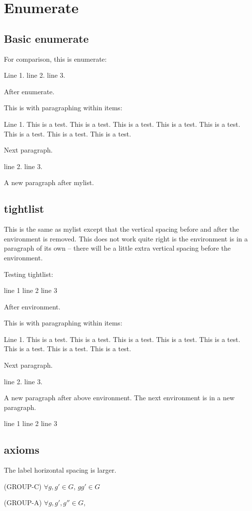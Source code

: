 \section{Enumerate}


\subsection{Basic enumerate}
For comparison, this is enumerate:
\begin{enumerate}
\li Line 1. 
\li line 2.
\li line 3.
\end{enumerate}
After enumerate.

This is with paragraphing within items:
\begin{enumerate}
\li Line 1. 
This is a test. This is a test. This is a test. This is a test. 
This is a test. This is a test. This is a test. This is a test. 

Next paragraph.
\lipsum[1]

\li line 2.
\li line 3.
\end{enumerate}

A new paragraph after mylist.




\newpage
\subsection{tightlist}

This is the same as mylist except that the vertical spacing
before and after the environment is removed.
This does not work quite right is the environment is in a paragraph of its
own -- there will be a little extra vertical spacing before the environment.

Testing tightlist:
\begin{tightlist}
\li line 1
\li line 2
\li line 3
\end{tightlist}
After environment.

This is with paragraphing within items:
\begin{tightlist}
\li Line 1. 
This is a test. This is a test. This is a test. This is a test. 
This is a test. This is a test. This is a test. This is a test. 

Next paragraph.
\lipsum[1]

\li line 2.
\li line 3.
\end{tightlist}

A new paragraph after above environment.
The next environment is in a new paragraph.

\begin{tightlist}
\li line 1
\li line 2
\li line 3
\end{tightlist}


\newpage
\subsection{axioms}

The label horizontal spacing is larger.

\begin{axioms}
  \item[(GROUP-C)] $\forall g,g' \in G$, $gg' \in G$
  \item[(GROUP-A)] $\forall g,g',g'' \in G$, 
\end{axioms}
